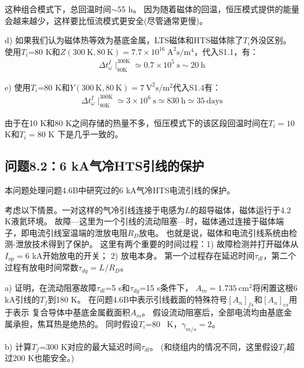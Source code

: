 这种组合模式下，总回温时间$\sim$55 h。
因为随着磁体的回温，恒压模式提供的能量会越来越少，这样要比恒流模式更安全(尽管通常更慢)。

d) 如果我们认为磁体热等效为基底金属，LTS磁体和HTS磁体除了$T_i$外没区别。
使用$T_i$=80 K和$Z(300\ \mathrm{K},80\ \mathrm{K})=7.7\times 10^{16}\ \mathrm{A^2 s/m^4}$，代入S1.1，有：
\begin{align*}%
\Delta t_{\omega}^{I}\mid_{80\mathrm{K}}^{300\mathrm{K}}\simeq 0.7\times 10^5\ \mathrm{s}\sim 20\ \mathrm{h}\tag{S1.7}
\end{align*}

e) 使用$T_i$=80 K和$Y(300\ \mathrm{K},80\ \mathrm{K})=7\ \mathrm{V^2 s/m^2}$代入S1.4有：
\begin{align*}%
\Delta t_{\omega}^{I}\mid_{80\mathrm{K}}^{300\mathrm{K}}\simeq 3\times 10^6\ \mathrm{s}\simeq 830\ \mathrm{h}\simeq 35\ \mathrm{days} \tag{S1.8}
\end{align*}

由于在10 K和80 K之间存储的热量不多，恒压模式下的该区段回温时间在$T_i=10$ K和$T_i=80$ K
下是几乎一致的。

\subsection{问题8.2：6 kA气冷HTS引线的保护}
本问题处理问题4.6B中研究过的6 kA气冷HTS电流引线的保护。

考虑以下情景。一对这样的气冷引线连接于电感为$L$的超导磁体，磁体运行于4.2 K液氦环境。
故障---这里为一个引线的流动阻塞---时，磁体通过连接于磁体端子，即电流引线室温端的泄放电阻$R_D$放电。
也就是说，磁体和电流引线系统由检测-泄放技术得到了保护。
这里有两个重要的时间过程：1) 故障检测并打开磁体从$I_{op}=$6 kA开始放电的开关；
2) 放电本身。
第一个过程存在延迟时间$\tau_{dl}$，第二个过程有放电时间常数$\tau_{dg}=L/R_D$。

a) 证明，在流动阻塞故障$\tau_{dl}$=5 s和$\tau_{dg}$=15 s条件下，
$A_m=1.735\ \mathrm{cm^2}$将闲置这根6 kA引线的$T_f$到180 K。
在问题4.6B中表示引线截面的特殊符号$[A_n]_{fs}$和$[A_n]_{cs}$用于表示
复合导体中基底金属截面积$A_m$。
假设流动阻塞后，全部电流均由基底金属承担，焦耳热是绝热的。
同时假设$T_i$=80~ K，$\gamma_{m/s}=2$。

b) 计算$T_f$=300 K对应的最大延迟时间$\tau_{dl}$。
(和绕组内的情况不同，这里假设$T_f$超过200 K也能安全。)


